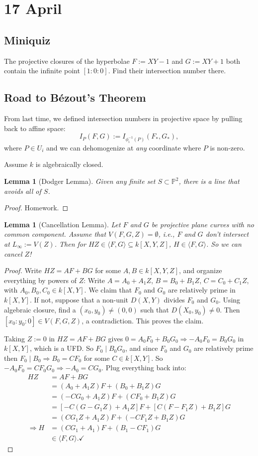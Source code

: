 \documentclass[12pt]{article}
\newcommand{\ita}[1]{\textit{#1}}
\newcommand{\vbrack}[1]{\langle #1\rangle}
\newtheorem{lemma}[theorem]{Lemma}
\theoremstyle{definition}
\begin{document}
\section{17 April}
\subsection{Miniquiz}
The projective closures of the hyperbolae $F:=XY-1$ and $G:=XY+1$ both contain the infinite point $[1:0:0]$. Find their intersection number there.
\subsection{Road to B\'ezout's Theorem}
From last time, we defined intersection numbers in projective space by pulling back to affine space:
\[I_P(F,G):=I_{\phi_i^{-1}(P)}(F_*,G_*),\]
where $P\in U_i$ and we can dehomogenize at \ita{any} coordinate where $P$ is non-zero.

Assume $k$ is algebraically closed.
\begin{lemma}[Dodger Lemma]
    Given any finite set $S\subset\mathbb{P}^2$, there is a line that avoids all of $S$.
\end{lemma}
\begin{proof}
    Homework.
\end{proof}
\begin{lemma}[Cancellation Lemma]
    Let $F$ and $G$ be projective plane curves with no common component. Assume that $V(F,G,Z)=\emptyset$, \ita{i.e.}, $F$ and $G$ don't intersect at $L_{\infty}:=V(Z)$. Then for $HZ\in\vbrack{F,G}\subseteq k[X,Y,Z]$, $H\in\vbrack{F,G}$. So we can cancel $Z$!
\end{lemma}
\begin{proof}
    Write $HZ=AF+BG$ for some $A,B\in k[X,Y,Z]$, and organize everything by powers of $Z$: Write $A=A_0+A_1Z$, $B=B_0+B_1Z$, $C=C_0+C_1Z$, with $A_0,B_0,C_0\in k[X,Y]$. We claim that $F_0$ and $G_0$ are relatively prime in $k[X,Y]$. If not, suppose that a non-unit $D(X,Y)$ divides $F_0$ and $G_0$. Using algebraic closure, find a $(x_0,y_0)\neq(0,0)$ such that $D(X_0,y_0)\neq0$. Then $[x_0:y_0:0]\in V(F,G,Z)$, a contradiction. This proves the claim.
    
    Taking $Z:=0$ in $HZ=AF+BG$ gives $0=A_0F_0+B_0G_0\Rightarrow-A_0F_0=B_0G_0$ in $k[X,Y]$, which is a UFD. So $F_0\mid B_0G_0$, and since $F_0$ and $G_0$ are relatively prime then $F_0\mid B_0\Rightarrow B_0=CF_0$ for some $C\in k[X,Y]$. So $-A_0F_0=CF_0G_0\Rightarrow-A_0=CG_0$. Plug everything back into:
    \begin{align*}
        HZ&=AF+BG\\
        &=(A_0+A_1Z)F+(B_0+B_1Z)G\\
        &=(-CG_0+A_1Z)F+(CF_0+B_1Z)G\\
        &=[-C(G-G_1Z)+A_1Z]F+[C(F-F_1Z)+B_1Z]G\\
        &=(CG_1Z+A_1Z)F+(-CF_1Z+B_1Z)G\\
        \Rightarrow H&=(CG_1+A_1)F+(B_1-CF_1)G\\
        &\in\vbrack{F,G}.\checkmark
    \end{align*}
\end{proof}
\end{document}
